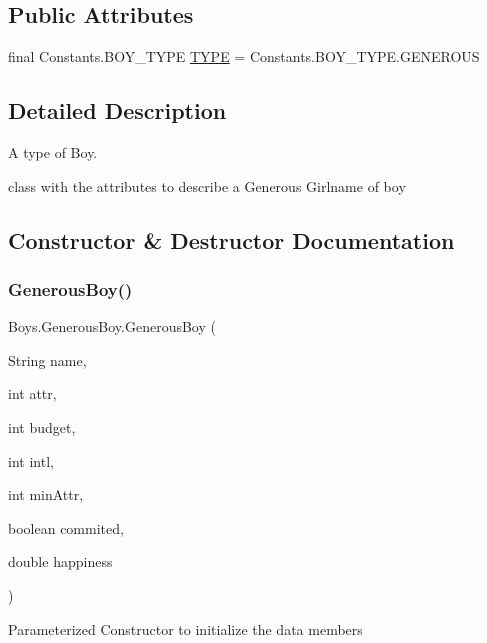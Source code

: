 \subsection*{Public Attributes}
\begin{DoxyCompactItemize}
\item 
final Constants.\+B\+O\+Y\+\_\+\+T\+Y\+PE \hyperlink{class_boys_1_1_generous_boy_ab3997644946f214b45321cfbf915cebf}{T\+Y\+PE} = Constants.\+B\+O\+Y\+\_\+\+T\+Y\+P\+E.\+G\+E\+N\+E\+R\+O\+US
\end{DoxyCompactItemize}


\subsection{Detailed Description}
A type of Boy. 

class with the attributes to describe a Generous Girlname of boy 

\subsection{Constructor \& Destructor Documentation}
\mbox{\label{class_boys_1_1_generous_boy_ab80b3dd04f4b48fbe1993e9790ecffec}} 
\subsubsection{\texorpdfstring{Generous\+Boy()}{GenerousBoy()}\hspace{0.1cm}{\footnotesize\ttfamily [1/2]}}
{\footnotesize\ttfamily Boys.\+Generous\+Boy.\+Generous\+Boy (\begin{DoxyParamCaption}\item[{String}]{name,  }\item[{int}]{attr,  }\item[{int}]{budget,  }\item[{int}]{intl,  }\item[{int}]{min\+Attr,  }\item[{boolean}]{commited,  }\item[{double}]{happiness }\end{DoxyParamCaption})\hspace{0.3cm}{\ttfamily [inline]}}

Parameterized Constructor to initialize the data members \mbox{\label{class_boys_1_1_generous_boy_a2af1dc8d53261756f2dac1930c83bdeb}} 
